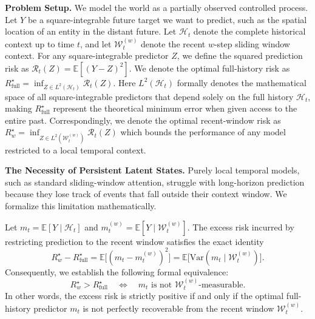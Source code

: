 \documentclass{llmxive}
\begin{document}
\textbf{Problem Setup.} 
We model the world as a partially observed controlled process. Let $Y$ be a square-integrable future target we want to predict, such as the spatial location of an entity in the distant future. Let $\mathcal{H}_t$ denote the complete historical context up to time $t$, and let $\mathcal{W}_t^{(w)}$ denote the recent $w$-step sliding window context. For any square-integrable predictor $Z$, we define the squared prediction risk as $\mathcal{R}_t(Z) = \mathbb{E}[(Y-Z)^2]$. We denote the optimal full-history risk as $R_{\mathrm{full}}^\star = \inf_{Z \in L^2(\mathcal{H}_t)} \mathcal{R}_t(Z)$. Here $L^2(\mathcal{H}_t)$ formally denotes the mathematical space of all square-integrable predictors that depend solely on the full history $\mathcal{H}_t$, making $R_{\mathrm{full}}^\star$ represent the theoretical minimum error when given access to the entire past. Correspondingly, we denote the optimal recent-window risk as $R_{w}^\star = \inf_{Z \in L^2(\mathcal{W}_t^{(w)})} \mathcal{R}_t(Z)$ which bounds the performance of any model restricted to a local temporal context.



\textbf{The Necessity of Persistent Latent States.}
Purely local temporal models, such as standard sliding-window attention, struggle with long-horizon prediction because they lose track of events that fall outside their context window. We formalize this limitation mathematically.

\begin{theorem}
\label{thm:necessity}
Let $m_t = \mathbb{E}[Y\mid \mathcal{H}_t]$ and $m_t^{(w)} = \mathbb{E}[Y\mid \mathcal{W}_t^{(w)}]$. The excess risk incurred by restricting prediction to the recent window satisfies the exact identity
\begin{equation}
R_{w}^\star - R_{\mathrm{full}}^\star = \mathbb{E}\bigl[(m_t - m_t^{(w)})^2\bigr] = \mathbb{E}\bigl[\mathrm{Var}(m_t\mid \mathcal{W}_t^{(w)})\bigr].
\end{equation}
Consequently, we establish the following formal equivalence:
\begin{equation}
R_{w}^\star > R_{\mathrm{full}}^\star
\quad\Longleftrightarrow\quad
m_t \text{ is not } \mathcal{W}_t^{(w)}\text{-measurable}.
\label{eq:iff_nonmeasurable}
\end{equation}
In other words, the excess risk is strictly positive if and only if the optimal full-history predictor $m_t$ is not perfectly recoverable from the recent window $\mathcal{W}_t^{(w)}$.
\end{theorem}
\end{document}
